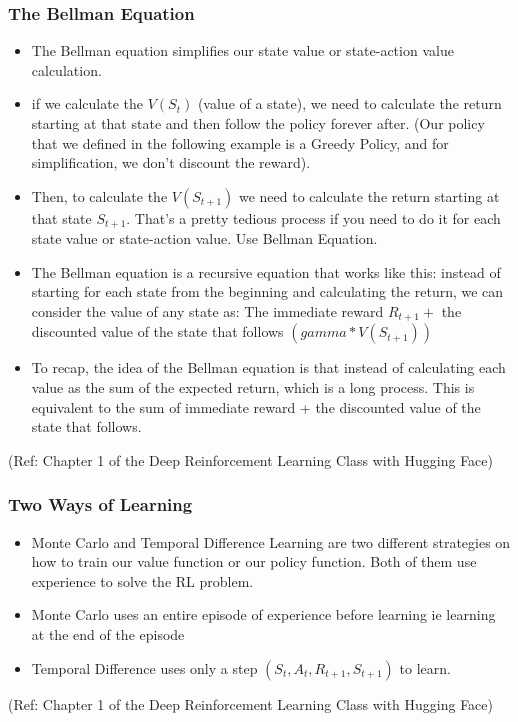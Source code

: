 \begin{frame}[fragile]\frametitle{The Bellman Equation}


\begin{itemize}
\item The Bellman equation simplifies our state value or state-action value calculation.
\item if we calculate the $V(S_t)$ (value of a state), we need to calculate the return starting at that state and then follow the policy forever after. (Our policy that we defined in the following example is a Greedy Policy, and for simplification, we don't discount the reward).
\item Then, to calculate the $V(S_{t+1})$ we need to calculate the return starting at that state $S_{t+1}$. That's a pretty tedious process if you need to do it for each state value or state-action value. Use Bellman Equation.
\item The Bellman equation is a recursive equation that works like this: instead of starting for each state from the beginning and calculating the return, we can consider the value of any state as: The immediate reward $R_{t+1} +$ the discounted value of the state that follows $( gamma * V(S_{t+1}))$
\item To recap, the idea of the Bellman equation is that instead of calculating each value as the sum of the expected return, which is a long process. This is equivalent to the sum of immediate reward + the discounted value of the state that follows.
\end{itemize}


{\tiny (Ref: Chapter 1 of the Deep Reinforcement Learning Class with Hugging Face)}


\end{frame}


\begin{frame}[fragile]\frametitle{Two Ways of Learning}


\begin{itemize}
\item Monte Carlo and Temporal Difference Learning are two different strategies on how to train our value function or our policy function. Both of them use experience to solve the RL problem.
\item Monte Carlo uses an entire episode of experience before learning ie learning at the end of the episode
\item Temporal Difference uses only a step $( S_t, A_t, R_{t+1}, S_{t+1})$ to learn.
\end{itemize}


{\tiny (Ref: Chapter 1 of the Deep Reinforcement Learning Class with Hugging Face)}


\end{frame}

